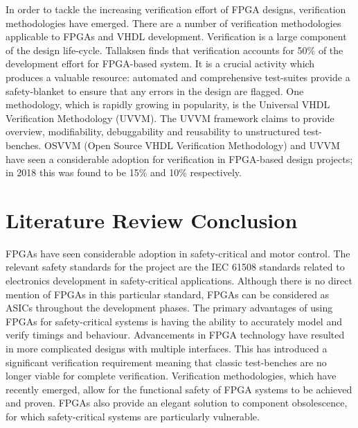In order to tackle the increasing verification effort of FPGA designs, verification methodologies have emerged\cite{Foster}. There are a number of verification methodologies applicable to FPGAs and VHDL development. Verification is a large component of the design life-cycle. %
Tallaksen finds that verification accounts for 50\% of the development effort for FPGA-based system\cite{Tallaksen}. It is a crucial activity which produces a valuable resource: automated and comprehensive test-suites provide a safety-blanket to ensure that any errors in the design are flagged\cite{janzen}.
One methodology, which is rapidly growing in popularity, is the Universal VHDL Verification Methodology (UVVM)\cite{Foster, Tallaksen}. The UVVM framework claims to provide overview, modifiability, debuggability and reusability to unstructured test-benches\cite{Tallaksen}.
OSVVM (Open Source VHDL Verification Methodology) and UVVM have seen a considerable adoption for verification in FPGA-based design projects; in 2018 this was found to be 15\% and 10\% respectively\cite{Foster,Tallaksen}.

\section{Literature Review Conclusion} %

FPGAs have seen considerable adoption in safety-critical and motor control. The relevant safety standards for the project are the IEC 61508 standards related to electronics development in safety-critical applications. Although there is no direct mention of FPGAs in this particular standard, FPGAs can be considered as ASICs throughout the development phases. 
The primary advantages of using FPGAs for safety-critical systems is having the ability to accurately model and verify timings and behaviour.
Advancements in FPGA technology have resulted in more complicated designs with multiple interfaces. This has introduced a significant verification requirement meaning that classic test-benches are no longer viable for complete verification. Verification methodologies, which have recently emerged, allow for the functional safety of FPGA systems to be achieved and proven. FPGAs also provide an elegant solution to component obsolescence, for which safety-critical systems are particularly vulnerable. 


